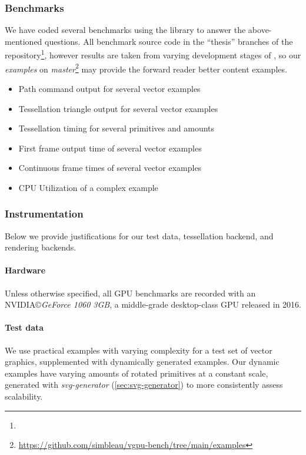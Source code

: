 \subsubsection{Benchmarks}\label{sec:benchmarks}
We have coded several benchmarks using the \toollinkedname library to answer the above-mentioned questions. All benchmark source code in the ``thesis'' branches of the \toollinkedname repository\footnote{\thesisrepo}, however results are taken from varying development stages of \toollinkedname, so our \textit{examples} on \textit{master}\footnote{\href{https://github.com/simbleau/vgpu-bench/tree/main/examples}{https://github.com/simbleau/vgpu-bench/tree/main/examples}} may provide the forward reader better content examples.

\begin{itemize}
    \item Path command output for several vector examples
    \item Tessellation triangle output for several vector examples
    \item Tessellation timing for several primitives and amounts
    \item First frame output time of several vector examples
    \item Continuous frame times of several vector examples
    \item CPU Utilization of a complex example
\end{itemize}

\subsubsection{Instrumentation}
Below we provide justifications for our test data, tessellation backend, and rendering backends.

\paragraph{Hardware}
Unless otherwise specified, all GPU benchmarks are recorded with an NVIDIA\copyright \textit{GeForce 1060 3GB}, a middle-grade desktop-class GPU released in 2016.\medskip

\paragraph{Test data}
We use practical examples with varying complexity for a test set of vector graphics, supplemented with dynamically generated examples. Our dynamic examples have varying amounts of rotated primitives at a constant scale, generated with \textit{svg-generator} (\cref{sec:svg-generator}) to more consistently assess scalability.\medskip


